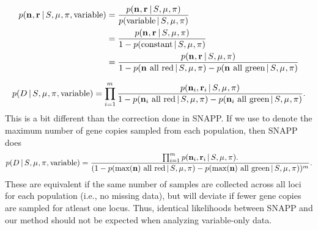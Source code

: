 \begin{equation}
\begin{split}
    \pr(\leafallelecounts, \leafredallelecounts \given \sptree, \murate, \gfreq, \textrm{variable})
    & =
    \frac{
        \pr(\leafallelecounts, \leafredallelecounts \given \sptree, \murate, \gfreq)
    }{
        \pr(\textrm{variable} \given \sptree, \murate, \gfreq)
    } \\
    & =
    \frac{
        \pr(\leafallelecounts, \leafredallelecounts \given \sptree, \murate, \gfreq)
    }{
        1 - \pr(\textrm{constant} \given \sptree, \murate, \gfreq)
    } \\
    & =
    \frac{
        \pr(\leafallelecounts, \leafredallelecounts \given \sptree, \murate, \gfreq)
    }{
        1 - \pr(\leafallelecounts \textrm{ all red} \given \sptree, \murate, \gfreq)
        - \pr(\leafallelecounts \textrm{ all green} \given \sptree, \murate, \gfreq)
    }
    \label{eq:variablemarkerlikelihood}
\end{split}
\end{equation}

\begin{equation}
    \pr(\comparisondata \given \sptree, \murate, \gfreq, \textrm{variable})
    =
    \prod_{i=1}^{\nloci}
    \frac{
        \pr(\leafallelecounts[i], \leafredallelecounts[i] \given \sptree, \murate, \gfreq)
    }{
        1 - \pr(\leafallelecounts[i] \textrm{ all red} \given \sptree, \murate, \gfreq)
        - \pr(\leafallelecounts[i] \textrm{ all green} \given \sptree, \murate, \gfreq)
    }.
    \label{eq:variablecomparisonlikelihood}
\end{equation}
This is a bit different than the correction done in SNAPP.
If we use \maxleafallelecounts to denote the maximum number
of gene copies sampled from each population, then SNAPP does
\begin{equation}
    \pr(\comparisondata \given \sptree, \murate, \gfreq, \textrm{variable})
    =
    \frac{
        \prod_{i=1}^{\nloci}
        \pr(\leafallelecounts[i], \leafredallelecounts[i] \given \sptree, \murate, \gfreq).
    }{
        (1 - \pr(\maxleafallelecounts \textrm{ all red} \given \sptree, \murate, \gfreq)
        - \pr(\maxleafallelecounts \textrm{ all green} \given \sptree, \murate, \gfreq))^{\nloci}
    }.
    \label{eq:snappvariablecomparisonlikelihood}
\end{equation}
These are equivalent if the same number of samples are collected across all
loci for each population (i.e., no missing data), but will deviate if fewer
gene copies are sampled for atleast one locus.
Thus, identical likelihoods between SNAPP and our method should not be expected
when analyzing variable-only data.

